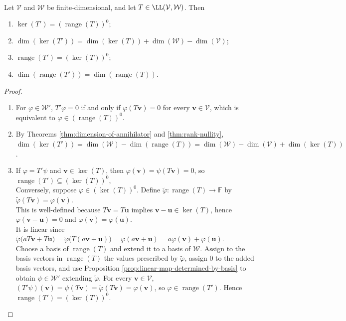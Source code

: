 \begin{theorem} \label{thm:dual-kernel-range-annihilator} \\
Let $\mathcal{V}$ and $\mathcal{W}$ be finite-dimensional, and let $T\in\LL(\mathcal{V},\mathcal{W})$. Then
\begin{enumerate}[label=(\roman*)]
\setlength{\itemsep}{0pt}
\item $\ker(T')=(\operatorname{range}(T))^0$;
\item $\dim(\ker(T'))=\dim(\ker(T))+\dim(\mathcal{W})-\dim(\mathcal{V})$;
\item $\operatorname{range}(T')=(\ker(T))^0$;
\item $\dim(\operatorname{range}(T'))=\dim(\operatorname{range}(T))$.
\end{enumerate}
\begin{proof}
\begin{enumerate}[label=(\roman*)]
\setlength{\itemsep}{0pt}
\item
For $\varphi\in\mathcal{W}'$, $T'\varphi=0$ if and only if $\varphi(T\mathbf{v})=0$ for every $\mathbf{v}\in\mathcal{V}$, which is equivalent to $\varphi\in(\operatorname{range}(T))^0$.
\item By Theorems \ref{thm:dimension-of-annihilator} and \ref{thm:rank-nullity}, $\dim(\ker(T')) =\dim(\mathcal{W})-\dim(\operatorname{range}(T)) =\dim(\mathcal{W})-\dim(\mathcal{V})+\dim(\ker(T))$.
\item If $\varphi=T'\psi$ and $\mathbf{v}\in\ker(T)$, then $\varphi(\mathbf{v})=\psi(T\mathbf{v})=0$, so $\operatorname{range}(T')\subseteq(\ker(T))^0$,\\
Conversely, suppose $\varphi\in(\ker(T))^0$. Define $\widetilde{\varphi}:\operatorname{range}(T)\to\mathbb{F}$ by $\widetilde{\varphi}(T\mathbf{v})=\varphi(\mathbf{v})$.\\
This is well-defined because $T\mathbf{v}=T\mathbf{u}$ implies $\mathbf{v}-\mathbf{u}\in\ker(T)$, hence $\varphi(\mathbf{v}-\mathbf{u})=0$ and $\varphi(\mathbf{v})=\varphi(\mathbf{u})$.\\
It is linear since $\widetilde{\varphi}\big(aT\mathbf{v}+T\mathbf{u}\big) =\widetilde{\varphi}\big(T(a\mathbf{v}+\mathbf{u})\big) =\varphi(a\mathbf{v}+\mathbf{u}) =a\varphi(\mathbf{v})+\varphi(\mathbf{u})$.\\
Choose a basis of $\operatorname{range}(T)$ and extend it to a basis of $\mathcal{W}$. Assign to the basis vectors in $\operatorname{range}(T)$ the values prescribed by $\widetilde{\varphi}$, assign $0$ to the added basis vectors, and use Proposition \ref{prop:linear-map-determined-by-basis} to obtain $\psi\in\mathcal{W}'$ extending $\widetilde{\varphi}$. For every $\mathbf{v}\in\mathcal{V}$, $(T'\psi)(\mathbf{v})=\psi(T\mathbf{v})=\widetilde{\varphi}(T\mathbf{v})=\varphi(\mathbf{v})$, so $\varphi\in\operatorname{range}(T')$. Hence $\operatorname{range}(T')=(\ker(T))^0$.

\end{enumerate}
\end{proof}
\end{theorem}
